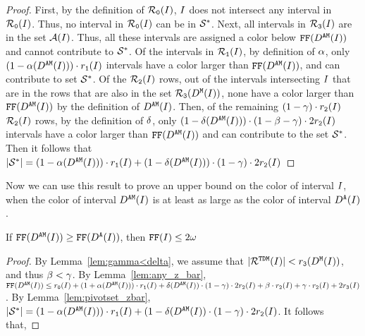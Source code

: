 {\begin{proof}
    First, by the definition of $\mathcal{R}_\texttt{0}(I)$, $I$ does not intersect any interval in $\mathcal{R}_\texttt{0}(I)$.
    Thus, no interval in $\mathcal{R}_\texttt{0}(I)$ can be in $\mathcal{S}^*$.
    Next, all intervals in $\mathcal{R}_\texttt{3}(I)$ are in the set $\mathcal{A}(I)$.
    Thus, all these intervals are assigned a color below $\text{\texttt{FF}}(D^\texttt{AM}(I))$ and cannot contribute to $\mathcal{S}^*$.
    Of the intervals in $\mathcal{R}_\texttt{1}(I)$, by definition of $\alpha$, only $(1 - \alpha(D^\texttt{AM}(I)))\cdot r_\texttt{1}(I)$ intervals have a color larger than $\text{\texttt{FF}}(D^\texttt{AM}(I))$, and can contribute to set $\mathcal{S}^*$.
    Of the $\mathcal{R}_\texttt{2}(I)$ rows, out of the intervals intersecting $I$ that are in the rows that are also in the set $\mathcal{R}_\texttt{3}(D^\texttt{M}(I))$, none have a color larger than $\text{\texttt{FF}}(D^\texttt{AM}(I))$ by the definition of $D^\texttt{AM}(I)$.
    Then, of the remaining $(1 - \gamma) \cdot r_\texttt{2}(I)$ $\mathcal{R}_\texttt{2}(I)$ rows, by the definition of $\delta$, only $(1 - \delta(D^\texttt{AM}(I))) \cdot (1 - \beta - \gamma) \cdot 2r_\texttt{2}(I)$ intervals have a color larger than $\text{\texttt{FF}}(D^\texttt{AM}(I))$ and can contribute to the set $\mathcal{S}^*$.
    Then it follows that $|\mathcal{S}^*| = (1 - \alpha(D^\texttt{AM}(I)))\cdot r_\texttt{1}(I) + (1 - \delta(D^\texttt{AM}(I))) \cdot (1 - \gamma) \cdot 2r_\texttt{2}(I) $
\end{proof}

\medskip


Now we can use this result to prove an upper bound on the color of interval $I$, when the color of interval $D^\texttt{AM}(I)$ is at least as large as the color of interval $D^\texttt{A}(I)$.

\begin{lemma}
    \label{lem:cy>=cu}
    If $\text{\texttt{FF}}(D^\texttt{AM}(I)) \geq \text{\texttt{FF}}(D^\texttt{A}(I))$, then $\text{\texttt{FF}}(I) \leq 2\omega$   
\end{lemma}

\begin{proof}
    By Lemma~\ref{lem:gamma<delta}, we assume that $|\mathcal{R}^{\texttt{TDM}}(I)| < r_\texttt{3}(D^\texttt{M}(I))$, and thus $\beta  < \gamma$.
    By Lemma~\ref{lem:any_z_bar}, $\text{\texttt{FF}}(D^\texttt{AM}(I)) \leq r_\texttt{0}(I) + (1 + \alpha(D^\texttt{AM}(I))) \cdot r_\texttt{1}(I) + \delta(D^\texttt{AM}(I)) \cdot (1 - \gamma) \cdot 2r_\texttt{2}(I) + \beta  \cdot r_\texttt{2}(I) + \gamma  \cdot r_\texttt{2}(I) + 2r_\texttt{3}(I)$.
    By Lemma~\ref{lem:pivotset_zbar}, $|\mathcal{S}^*| = (1-\alpha(D^\texttt{AM}(I))) \cdot r_\texttt{1}(I) + (1 - \delta(D^\texttt{AM}(I)) \cdot (1 - \gamma) \cdot 2r_\texttt{2}(I)$.
    It follows that,
    

\end{proof}}
